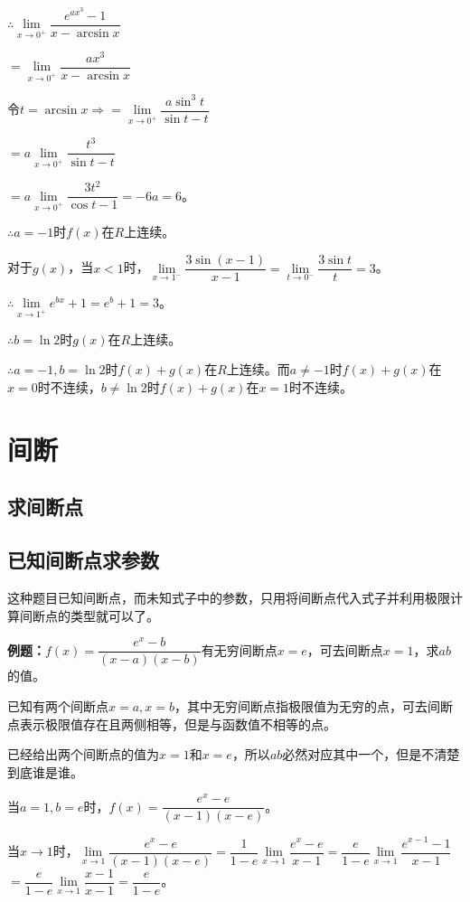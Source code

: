 $\therefore\lim\limits_{x\to 0^+}\dfrac{e^{ax^3}-1}{x-\arcsin x}$\medskip

$=\lim\limits_{x\to 0^+}\dfrac{ax^3}{x-\arcsin x}$\medskip

$\text{令}t=\arcsin x\Rightarrow=\lim\limits_{x\to 0^+}\dfrac{a\sin^3t}{\sin t-t}$

$=a\lim\limits_{x\to 0^+}\dfrac{t^3}{\sin t-t}$\medskip

$=a\lim\limits_{x\to 0^+}\dfrac{3t^2}{\cos t-1}=-6a=6$。\medskip

$\therefore a=-1$时$f(x)$在$R$上连续。\medskip

对于$g(x)$，当$x<1$时，$\lim\limits_{x\to 1^-}\dfrac{3\sin(x-1)}{x-1}=\lim\limits_{t\to 0^-}\dfrac{3\sin t}{t}=3$。\medskip

$\therefore\lim\limits_{x\to 1^+}e^{bx}+1=e^b+1=3$。\medskip

$\therefore b=\ln 2$时$g(x)$在$R$上连续。\medskip

$\therefore a=-1,b=\ln 2$时$f(x)+g(x)$在$R$上连续。而$a\neq -1$时$f(x)+g(x)$在$x=0$时不连续，$b\neq\ln 2$时$f(x)+g(x)$在$x=1$时不连续。


\section{间断}

\subsection{求间断点}

\subsection{已知间断点求参数}

这种题目已知间断点，而未知式子中的参数，只用将间断点代入式子并利用极限计算间断点的类型就可以了。

\textbf{例题：}$f(x)=\dfrac{e^x-b}{(x-a)(x-b)}$有无穷间断点$x=e$，可去间断点$x=1$，求$ab$的值。

已知有两个间断点$x=a,x=b$，其中无穷间断点指极限值为无穷的点，可去间断点表示极限值存在且两侧相等，但是与函数值不相等的点。

已经给出两个间断点的值为$x=1$和$x=e$，所以$ab$必然对应其中一个，但是不清楚到底谁是谁。

当$a=1,b=e$时，$f(x)=\dfrac{e^x-e}{(x-1)(x-e)}$。\medskip

当$x\to 1$时，$\lim\limits_{x\to 1}\dfrac{e^x-e}{(x-1)(x-e)}$$=\dfrac{1}{1-e}\lim\limits_{x\to 1}\dfrac{e^x-e}{x-1}$$=\dfrac{e}{1-e}\lim\limits_{x\to 1}\dfrac{e^{x-1}-1}{x-1}$$=\dfrac{e}{1-e}\lim\limits_{x\to 1}\dfrac{x-1}{x-1}$$=\dfrac{e}{1-e}$。\medskip

